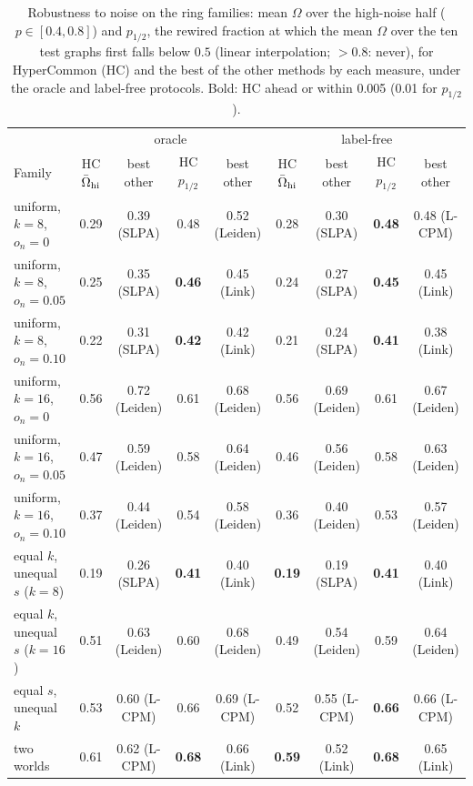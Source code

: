 \begin{table}[t]
\caption{Robustness to noise on the ring families: mean $\Omega$ over the high-noise half ($p\in[0.4,0.8]$) and $p_{1/2}$, the rewired fraction at which the mean $\Omega$ over the ten test graphs first falls below $0.5$ (linear interpolation; $>0.8$: never), for HyperCommon (HC) and the best of the other methods by each measure, under the oracle and label-free protocols. Bold: HC ahead or within 0.005 (0.01 for $p_{1/2}$).}
\label{tab:robust}
\footnotesize\setlength{\tabcolsep}{3pt}
\begin{ruledtabular}
\begin{tabular}{lcccccccc}
 & \multicolumn{4}{c}{oracle} & \multicolumn{4}{c}{label-free} \\
Family & HC $\bar\Omega_{\rm hi}$ & best other & HC $p_{1/2}$ & best other & HC $\bar\Omega_{\rm hi}$ & best other & HC $p_{1/2}$ & best other \\
\hline
uniform, $k{=}8$, $o_n{=}0$ & 0.29 & 0.39 (SLPA) & 0.48 & 0.52 (Leiden) & 0.28 & 0.30 (SLPA) & \textbf{0.48} & 0.48 (L-CPM) \\
uniform, $k{=}8$, $o_n{=}0.05$ & 0.25 & 0.35 (SLPA) & \textbf{0.46} & 0.45 (Link) & 0.24 & 0.27 (SLPA) & \textbf{0.45} & 0.45 (Link) \\
uniform, $k{=}8$, $o_n{=}0.10$ & 0.22 & 0.31 (SLPA) & \textbf{0.42} & 0.42 (Link) & 0.21 & 0.24 (SLPA) & \textbf{0.41} & 0.38 (Link) \\
uniform, $k{=}16$, $o_n{=}0$ & 0.56 & 0.72 (Leiden) & 0.61 & 0.68 (Leiden) & 0.56 & 0.69 (Leiden) & 0.61 & 0.67 (Leiden) \\
uniform, $k{=}16$, $o_n{=}0.05$ & 0.47 & 0.59 (Leiden) & 0.58 & 0.64 (Leiden) & 0.46 & 0.56 (Leiden) & 0.58 & 0.63 (Leiden) \\
uniform, $k{=}16$, $o_n{=}0.10$ & 0.37 & 0.44 (Leiden) & 0.54 & 0.58 (Leiden) & 0.36 & 0.40 (Leiden) & 0.53 & 0.57 (Leiden) \\
\hline
equal $k$, unequal $s$ ($k{=}8$) & 0.19 & 0.26 (SLPA) & \textbf{0.41} & 0.40 (Link) & \textbf{0.19} & 0.19 (SLPA) & \textbf{0.41} & 0.40 (Link) \\
equal $k$, unequal $s$ ($k{=}16$) & 0.51 & 0.63 (Leiden) & 0.60 & 0.68 (Leiden) & 0.49 & 0.54 (Leiden) & 0.59 & 0.64 (Leiden) \\
equal $s$, unequal $k$ & 0.53 & 0.60 (L-CPM) & 0.66 & 0.69 (L-CPM) & 0.52 & 0.55 (L-CPM) & \textbf{0.66} & 0.66 (L-CPM) \\
two worlds & 0.61 & 0.62 (L-CPM) & \textbf{0.68} & 0.66 (Link) & \textbf{0.59} & 0.52 (Link) & \textbf{0.68} & 0.65 (Link) \\

\end{tabular}
\end{ruledtabular}
\end{table}
